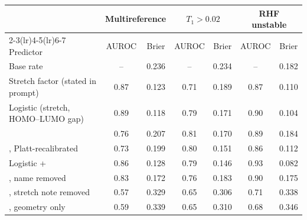 \begin{tabular}{lcccccc}
\toprule
& \multicolumn{2}{c}{Multireference} & \multicolumn{2}{c}{$T_1>0.02$} & \multicolumn{2}{c}{RHF unstable} \\
\cmidrule(lr){2-3}\cmidrule(lr){4-5}\cmidrule(lr){6-7}
Predictor & AUROC & Brier & AUROC & Brier & AUROC & Brier \\
\midrule
Base rate & -- & 0.236 & -- & 0.234 & -- & 0.182 \\
Stretch factor (stated in prompt) & 0.87 & 0.123 & 0.71 & 0.189 & 0.87 & 0.110 \\
Logistic (stretch, HOMO--LUMO gap) & 0.89 & 0.118 & 0.79 & 0.171 & 0.90 & 0.104 \\
\addlinespace
\jev{} & 0.76 & 0.207 & 0.81 & 0.170 & 0.89 & 0.184 \\
\jev{}, Platt-recalibrated & 0.73 & 0.199 & 0.80 & 0.151 & 0.86 & 0.112 \\
Logistic + \jev{} & 0.86 & 0.128 & 0.79 & 0.146 & 0.93 & 0.082 \\
\addlinespace
\jev{}, name removed & 0.83 & 0.172 & 0.76 & 0.183 & 0.90 & 0.175 \\
\jev{}, stretch note removed & 0.57 & 0.329 & 0.65 & 0.306 & 0.71 & 0.338 \\
\jev{}, geometry only & 0.59 & 0.339 & 0.65 & 0.310 & 0.68 & 0.346 \\
\bottomrule
\end{tabular}
